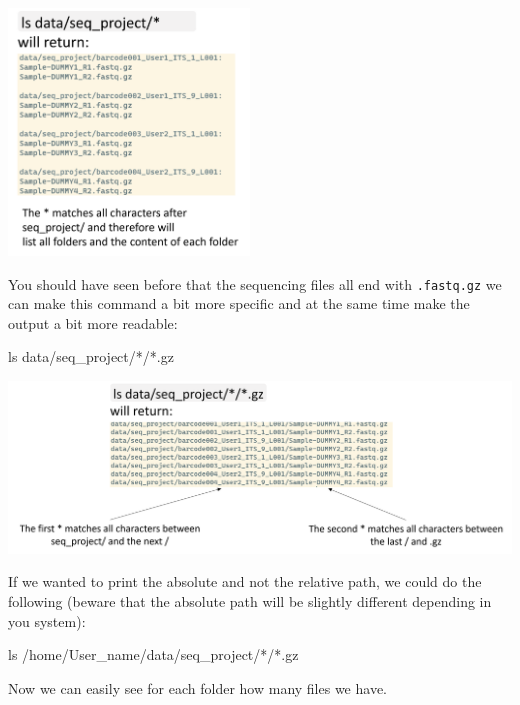 \documentclass[
  letterpaper,
  DIV=11,
  numbers=noendperiod]{scrreprt}
\newenvironment{Shaded}{}{}
\newcommand{\FunctionTok}[1]{\textcolor[rgb]{0.44,0.26,0.76}{#1}}
\newcommand{\NormalTok}[1]{\textcolor[rgb]{0.14,0.16,0.18}{#1}}
\newcommand{\PreprocessorTok}[1]{\textcolor[rgb]{0.84,0.23,0.29}{#1}}
\begin{document}
\includegraphics[width=2.52083in,height=\textheight]{../img/wildcards_0.png}

You should have seen before that the sequencing files all end with
\texttt{.fastq.gz} we can make this command a bit more specific and at
the same time make the output a bit more readable:

\begin{Shaded}
\begin{Highlighting}[]
\FunctionTok{ls}\NormalTok{ data/seq\_project/}\PreprocessorTok{*}\NormalTok{/}\PreprocessorTok{*}\NormalTok{.gz}
\end{Highlighting}
\end{Shaded}

\includegraphics[width=5.8125in,height=\textheight]{../img/wildcards_1.png}

If we wanted to print the absolute and not the relative path, we could
do the following (beware that the absolute path will be slightly
different depending in you system):

\begin{Shaded}
\begin{Highlighting}[]
\FunctionTok{ls}\NormalTok{ /home/User\_name/data/seq\_project/}\PreprocessorTok{*}\NormalTok{/}\PreprocessorTok{*}\NormalTok{.gz}
\end{Highlighting}
\end{Shaded}

Now we can easily see for each folder how many files we have.
\end{document}
